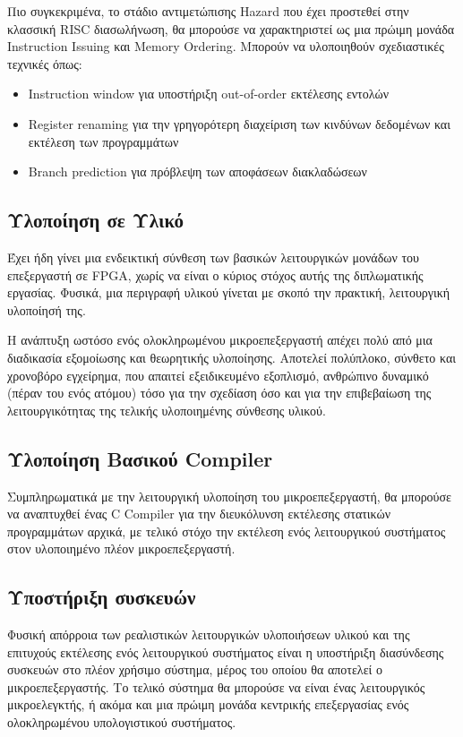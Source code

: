 \documentclass[11pt]{extarticle}
\begin{document}
Πιο συγκεκριμένα, το στάδιο αντιμετώπισης Hazard που έχει προστεθεί στην κλασσική RISC διασωλήνωση, θα μπορούσε να χαρακτηριστεί ως μια πρώιμη μονάδα Instruction Issuing και Memory Ordering.
Μπορούν να υλοποιηθούν σχεδιαστικές τεχνικές όπως:
\begin{itemize}
    \item Instruction window για υποστήριξη out-of-order εκτέλεσης εντολών
    \item Register renaming για την γρηγορότερη διαχείριση των κινδύνων δεδομένων και εκτέλεση των προγραμμάτων
    \item Branch prediction για πρόβλεψη των αποφάσεων διακλαδώσεων
\end{itemize}

\subsection{Υλοποίηση σε Υλικό}
Έχει ήδη γίνει μια ενδεικτική σύνθεση των βασικών λειτουργικών μονάδων του επεξεργαστή σε FPGA, χωρίς να είναι ο κύριος στόχος αυτής της διπλωματικής εργασίας.
Φυσικά, μια περιγραφή υλικού γίνεται με σκοπό την πρακτική, λειτουργική υλοποίησή της.

Η ανάπτυξη ωστόσο ενός ολοκληρωμένου μικροεπεξεργαστή απέχει πολύ από μια διαδικασία εξομοίωσης και θεωρητικής υλοποίησης.
Αποτελεί πολύπλοκο, σύνθετο και χρονοβόρο εγχείρημα, που απαιτεί εξειδικευμένο εξοπλισμό, ανθρώπινο δυναμικό (πέραν του ενός ατόμου) τόσο για την σχεδίαση όσο και για την επιβεβαίωση της λειτουργικότητας της τελικής υλοποιημένης σύνθεσης υλικού.

\subsection{Υλοποίηση Βασικού Compiler}
Συμπληρωματικά με την λειτουργική υλοποίηση του μικροεπεξεργαστή, θα μπορούσε να αναπτυχθεί ένας C Compiler για την διευκόλυνση εκτέλεσης στατικών προγραμμάτων αρχικά, με τελικό στόχο την εκτέλεση ενός λειτουργικού συστήματος στον υλοποιημένο πλέον μικροεπεξεργαστή.

\subsection{Υποστήριξη συσκευών}
Φυσική απόρροια των ρεαλιστικών λειτουργικών υλοποιήσεων υλικού και της επιτυχούς εκτέλεσης ενός λειτουργικού συστήματος είναι η υποστήριξη διασύνδεσης συσκευών στο πλέον χρήσιμο σύστημα, μέρος του οποίου θα αποτελεί ο μικροεπεξεργαστής.
Το τελικό σύστημα θα μπορούσε να είναι ένας λειτουργικός μικροελεγκτής, ή ακόμα και μια πρώιμη μονάδα κεντρικής επεξεργασίας ενός ολοκληρωμένου υπολογιστικού συστήματος.
\end{document}
